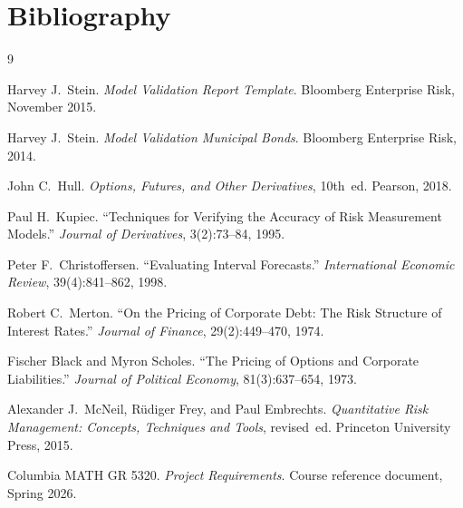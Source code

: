 \documentclass[11pt]{article}
\begin{document}
\section{Bibliography}

\begin{thebibliography}{9}

Harvey J.\ Stein.
\textit{Model Validation Report Template}.
Bloomberg Enterprise Risk, November 2015.

Harvey J.\ Stein.
\textit{Model Validation Municipal Bonds}.
Bloomberg Enterprise Risk, 2014.

John C.\ Hull.
\textit{Options, Futures, and Other Derivatives}, 10th~ed.
Pearson, 2018.

Paul H.\ Kupiec.
``Techniques for Verifying the Accuracy of Risk Measurement Models.''
\textit{Journal of Derivatives}, 3(2):73--84, 1995.

Peter F.\ Christoffersen.
``Evaluating Interval Forecasts.''
\textit{International Economic Review}, 39(4):841--862, 1998.

Robert C.\ Merton.
``On the Pricing of Corporate Debt: The Risk Structure of Interest Rates.''
\textit{Journal of Finance}, 29(2):449--470, 1974.

Fischer Black and Myron Scholes.
``The Pricing of Options and Corporate Liabilities.''
\textit{Journal of Political Economy}, 81(3):637--654, 1973.

Alexander J.\ McNeil, R\"udiger Frey, and Paul Embrechts.
\textit{Quantitative Risk Management: Concepts, Techniques and Tools},
revised~ed.
Princeton University Press, 2015.

Columbia MATH GR 5320.
\textit{Project Requirements}.
Course reference document, Spring 2026.

\end{thebibliography}
\end{document}
